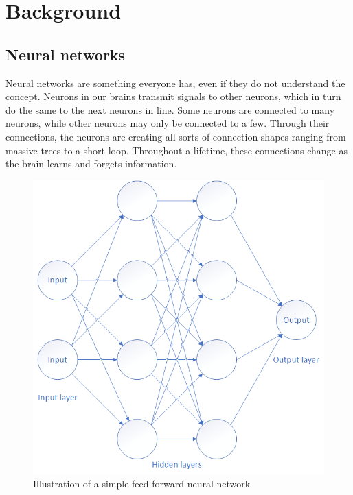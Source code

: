 \chapter{Background}


\section{Neural networks}


Neural networks are something everyone has, even if they do not understand the concept. 
Neurons in our brains transmit signals to other neurons, which in turn do the same to the next neurons in line. 
Some neurons are connected to many neurons, while other neurons may only be connected to a few. 
Through their connections, the neurons are creating all sorts of connection shapes ranging from massive trees to a short loop. 
Throughout a lifetime, these connections change as the brain learns and forgets information.

\begin{figure}[htbp]  %
  \centering
  \includegraphics[width=.6\textwidth]{figures/small_model.png}
  \caption{Illustration of a simple feed-forward neural network}
  \label{fig:simplenn}
\end{figure}


